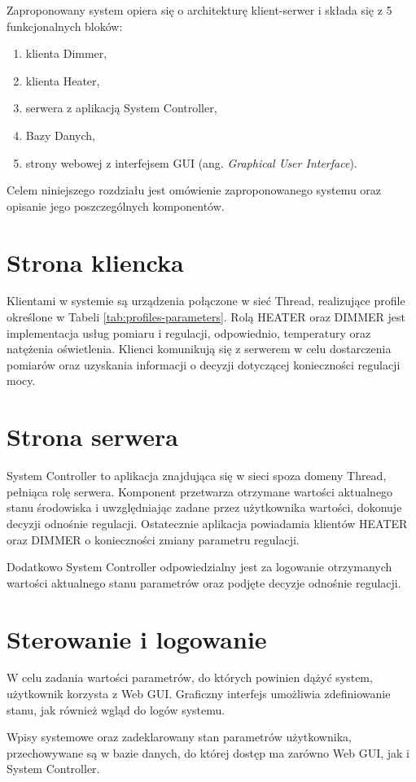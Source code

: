 Zaproponowany system opiera się o architekturę klient-serwer i składa się z 5 funkcjonalnych bloków:
\begin{enumerate}
    \item klienta Dimmer,
    \item klienta Heater,
    \item serwera z aplikacją System Controller,
    \item Bazy Danych,
    \item strony webowej z interfejsem GUI (ang. \textit{Graphical User Interface}).
\end{enumerate}

Celem niniejszego rozdziału jest omówienie zaproponowanego systemu oraz opisanie jego poszczególnych komponentów. 

\section{Strona kliencka}
\label{sec:system-clients}

Klientami w systemie są urządzenia połączone w sieć Thread, realizujące profile określone w Tabeli \ref{tab:profiles-parameters}. Rolą HEATER oraz DIMMER jest implementacja usług pomiaru i regulacji, odpowiednio, temperatury oraz natężenia oświetlenia.
Klienci komunikują się z serwerem w celu dostarczenia pomiarów oraz uzyskania informacji o decyzji dotyczącej konieczności regulacji mocy.
    
\section{Strona serwera}

System Controller to aplikacja znajdująca się w sieci spoza domeny Thread, pełniąca rolę serwera. Komponent przetwarza otrzymane wartości aktualnego stanu środowiska i uwzględniając zadane przez użytkownika wartości, dokonuje decyzji odnośnie regulacji. Ostatecznie aplikacja powiadamia klientów HEATER oraz DIMMER o konieczności zmiany parametru regulacji.

Dodatkowo System Controller odpowiedzialny jest za logowanie otrzymanych wartości aktualnego stanu parametrów oraz podjęte decyzje odnośnie regulacji.

\section{Sterowanie i logowanie}

W celu zadania wartości parametrów, do których powinien dążyć system, użytkownik korzysta z Web GUI. Graficzny interfejs umożliwia zdefiniowanie stanu, jak również wgląd do logów systemu.

Wpisy systemowe oraz zadeklarowany stan parametrów użytkownika, przechowywane są w bazie danych, do której dostęp ma zarówno Web GUI, jak i System Controller.